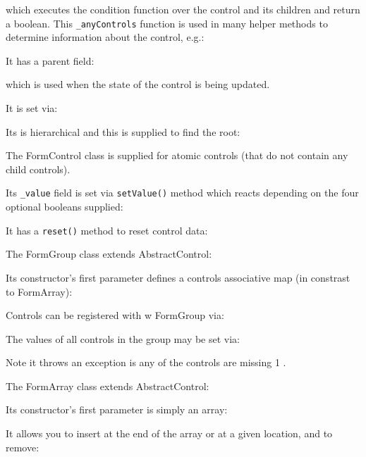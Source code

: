 

which executes the condition function over the control and its children and return a
boolean. This
\texttt{\_anyControls}
function is used in many helper methods to determine
information about the control, e.g.:



It has a parent field:



which is used when the state of the control is being updated.



It is set via:



Its is hierarchical and this is supplied to find the root:



The FormControl class is supplied for atomic controls (that do not contain any child
controls).



Its
\texttt{\_value}
field is set via
\texttt{setValue()}
method which reacts depending on the four
optional booleans supplied:



It has a
\texttt{reset()}
method to reset control data:



The FormGroup class extends AbstractControl:



Its constructor’s first parameter defines a controls associative map (in constrast to
FormArray):



Controls can be registered with w FormGroup via:



The values of all controls in the group may be set via:



Note it throws an exception is any of the controls are missing
1
.

The FormArray class extends AbstractControl:



Its constructor’s first parameter is simply an array:



It allows you to insert at the end of the array or at a given location, and to remove:


